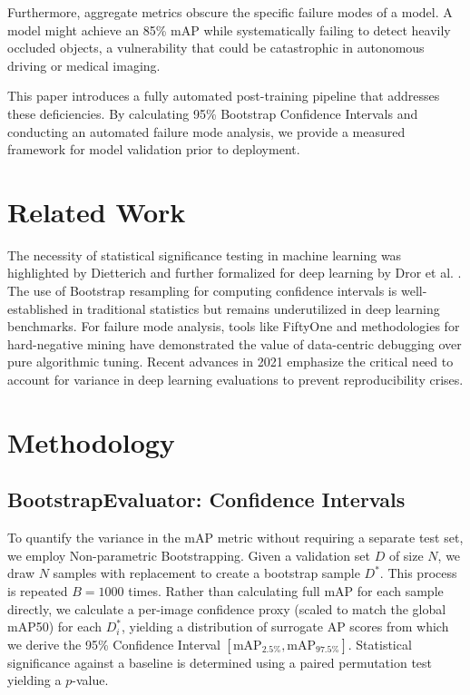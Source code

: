 \documentclass[conference]{IEEEtran}
\begin{document}
Furthermore, aggregate metrics obscure the specific failure modes of a model. A model might achieve an 85\% mAP while systematically failing to detect heavily occluded objects, a vulnerability that could be catastrophic in autonomous driving or medical imaging. 

This paper introduces a fully automated post-training pipeline that addresses these deficiencies. By calculating 95\% Bootstrap Confidence Intervals and conducting an automated failure mode analysis, we provide a measured framework for model validation prior to deployment.

\section{Related Work}
The necessity of statistical significance testing in machine learning was highlighted by Dietterich \cite{dietterich1998approximate} and further formalized for deep learning by Dror et al. \cite{dror2018hitchhiker}. The use of Bootstrap resampling \cite{efron1994introduction} for computing confidence intervals is well-established in traditional statistics but remains underutilized in deep learning benchmarks. For failure mode analysis, tools like FiftyOne \cite{moore2021fiftyone} and methodologies for hard-negative mining \cite{shrivastava2016training} have demonstrated the value of data-centric debugging over pure algorithmic tuning. Recent advances in 2021 \cite{bouthillier2021accounting} emphasize the critical need to account for variance in deep learning evaluations to prevent reproducibility crises.

\section{Methodology}

\subsection{BootstrapEvaluator: Confidence Intervals}
To quantify the variance in the mAP metric without requiring a separate test set, we employ Non-parametric Bootstrapping. Given a validation set $D$ of size $N$, we draw $N$ samples with replacement to create a bootstrap sample $D^*$. This process is repeated $B = 1000$ times. Rather than calculating full mAP for each sample directly, we calculate a per-image confidence proxy (scaled to match the global mAP50) for each $D^*_i$, yielding a distribution of surrogate AP scores from which we derive the 95\% Confidence Interval $[\text{mAP}_{2.5\%}, \text{mAP}_{97.5\%}]$. Statistical significance against a baseline is determined using a paired permutation test yielding a $p$-value.
\end{document}

